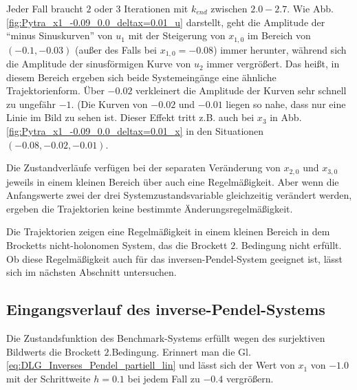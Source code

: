 Jeder Fall braucht $2$ oder $3$ Iterationen mit $k_{end}$ zwischen $2.0-2.7$. Wie Abb. \ref{fig:Pytra_x1_-0.09_0.0_deltax=0.01_u} darstellt, geht die Amplitude der ``minus Sinuskurven'' von $u_{1}$ mit der Steigerung von $x_{1,0}$ im Bereich von $(-0.1, -0.03)$ (außer des Falls bei $x_{1,0}=-0.08$) immer herunter, während sich die Amplitude der sinusförmigen Kurve von $u_{2}$ immer vergrößert. Das heißt, in diesem Bereich ergeben sich beide Systemeingänge eine ähnliche Trajektorienform. Über $-0.02$ verkleinert die Amplitude der Kurven sehr schnell zu ungefähr $-1$. (Die Kurven von $-0.02$ und $-0.01$ liegen so nahe, dass nur eine Linie im Bild zu sehen ist. Dieser Effekt tritt z.B. auch bei $x_{3}$ in Abb. \ref{fig:Pytra_x1_-0.09_0.0_deltax=0.01_x} in den Situationen $(-0.08, -0.02,-0.01)$.

Die Zustandverläufe verfügen bei der separaten Veränderung von $x_{2,0}$ und $x_{3,0}$ jeweils in einem kleinen Bereich über auch eine Regelmäßigkeit. Aber wenn die Anfangswerte zwei der drei Systemzustandsvariable gleichzeitig verändert werden, ergeben die Trajektorien keine bestimmte Änderungsregelmäßigkeit. 

Die Trajektorien zeigen eine Regelmäßigkeit in einem kleinen Bereich in dem Brocketts nicht-holonomen System, das die Brockett $2.$ Bedingung nicht erfüllt. Ob diese Regelmäßigkeit auch für das inversen-Pendel-System geeignet ist, lässt sich im nächsten Abschnitt untersuchen. 

\subsection{Eingangsverlauf des inverse-Pendel-Systems}
\label{Ausgang_Das_inverse_Pendel_System}
Die Zustandsfunktion des Benchmark-Systems erfüllt wegen des surjektiven Bildwerts die Brockett $2.$Bedingung. Erinnert man die Gl. \eqref{eq:DLG_Inverses_Pendel_partiell_lin} und lässt sich der Wert von $x_{1}$ von $-1.0$ mit der Schrittweite $h=0.1$ bei jedem Fall zu $-0.4$ vergrößern.

